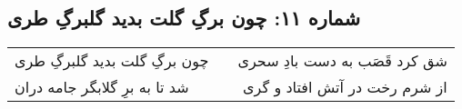 \begin{center}
\section*{شماره ۱۱: چون برگِ گلت بدید گلبرگِ طری}
\label{sec:011}
\begin{longtable}{l p{0.5cm} r}
چون برگِ گلت بدید گلبرگِ طری
&&
شق کرد قَصَب به دست بادِ سحری
\\
شد تا به برِ گلابگر جامه دران
&&
از شرم رخت در آتش افتاد و گری
\\
\end{longtable}
\end{center}
